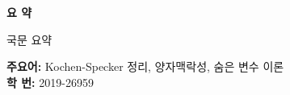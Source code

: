 \newpage

\thispagestyle{plain}
\begin{center}
    \Large
    \textbf{요 약}
\end{center}

국문 요약
\cite{MR2015280}

\textbf{주요어:} Kochen-Specker 정리, 양자맥락성, 숨은 변수 이론\\

\textbf{학 번:} 2019-26959
